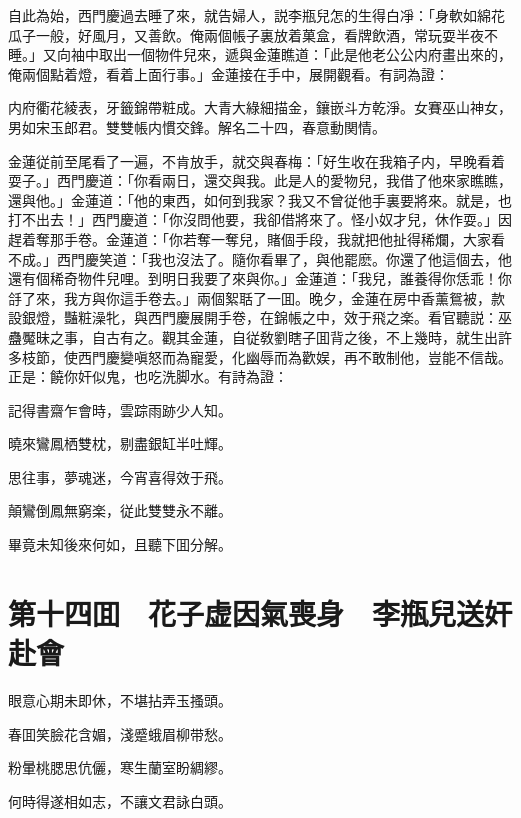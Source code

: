 自此為始，西門慶過去睡了來，就告婦人，説李瓶兒怎的生得白凈：「身軟如綿花瓜子一般，好風月，又善飲。俺兩個帳子裏放着菓盒，看牌飲酒，常玩耍半夜不睡。」又向袖中取出一個物件兒來，遞與金蓮瞧道：「此是他老公公内府畫出來的，俺兩個點着燈，看着上面行事。」金蓮接在手中，展開觀看。有詞為證：

内府衢花綾表，牙籤錦帶粧成。大青大綠細描金，鑲嵌斗方乾淨。女賽巫山神女，男如宋玉郎君。雙雙帳内慣交鋒。解名二十四，春意動関情。

金蓮従前至尾看了一遍，不肯放手，就交與春梅：「好生收在我箱子内，早晚看着耍子。」西門慶道：「你看兩日，還交與我。此是人的愛物兒，我借了他來家瞧瞧，還與他。」金蓮道：「他的東西，如何到我家？我又不曾従他手裏要將來。就是，也打不出去！」西門慶道：「你沒問他要，我卻借將來了。怪小奴才兒，休作耍。」因趕着奪那手卷。金蓮道：「你若奪一奪兒，賭個手段，我就把他扯得稀爛，大家看不成。」西門慶笑道：「我也沒法了。隨你看畢了，與他罷麽。你還了他這個去，他還有個稀奇物件兒哩。到明日我要了來與你。」金蓮道：「我兒，誰養得你恁乖！你㧱了來，我方與你這手卷去。」兩個絮聒了一囬。晚夕，金蓮在房中香薰鴛被，款設銀燈，豔粧澡牝，與西門慶展開手卷，在錦帳之中，效于飛之楽。看官聽説：巫蠱魘昧之事，自古有之。觀其金蓮，自従敎劉瞎子囬背之後，不上幾時，就生出許多枝節，使西門慶變嗔怒而為寵愛，化幽辱而為歡娱，再不敢制他，豈能不信哉。正是：饒你奸似鬼，也吃洗脚水。有詩為證：

記得書齋乍會時，雲踪雨跡少人知。

曉來鸞鳳栖雙枕，剔盡銀缸半吐輝。

思往事，夢魂迷，今宵喜得效于飛。

顛鸞倒鳳無窮楽，従此雙雙永不離。

畢竟未知後來何如，且聽下囬分解。

\chapter*{第十四囬　花子虚因氣喪身　李瓶兒送奸赴會}

眼意心期未即休，不堪拈弄玉搔頭。

春囬笑臉花含媚，淺蹙蛾眉柳带愁。

粉暈桃腮思伉儷，寒生蘭室盼綢繆。

何時得遂相如志，不讓文君詠白頭。

